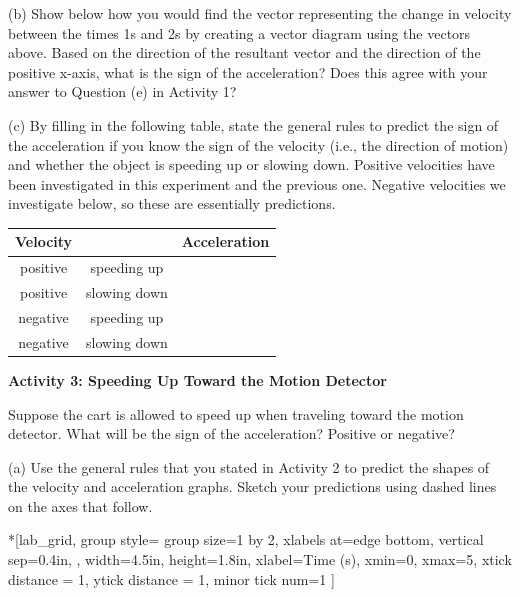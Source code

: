 (b) Show below how you would find the vector representing the change in velocity
between the times 1s and 2s by creating a vector diagram using the vectors 
 above. Based on the direction of the resultant vector and the direction of 
the positive x-axis, what is the sign of the acceleration? 
Does this agree with your answer to Question (e) in Activity 1?
\answerspace{25mm}

(c) By filling in the following table, state the general rules to predict the 
sign of the acceleration if you know the sign of the velocity (i.e., the 
direction of motion) and whether the object is speeding up or slowing down. 
Positive velocities have been investigated in this experiment and the previous 
one. Negative velocities we investigate below, so these are essentially 
predictions.

\vspace{0.3cm}
{\centering \begin{tabular}{|c|c|c|}
\hline
Velocity&
&
Acceleration\\
\hline
positive&
speeding up&
\\
\hline
positive&
slowing down&
\\
\hline
negative&
speeding up&
\\
\hline
negative&
slowing down&
\\
\hline
\end{tabular}\par}
\vspace{0.3cm}


\pagebreak[2]
\textbf{Activity 3: Speeding Up Toward the Motion Detector} 

Suppose the cart is allowed to speed up when traveling toward the motion 
detector. What will be the sign of the acceleration? Positive or negative? 

(a) Use the general rules that you stated in Activity 2 to predict the shapes
of the velocity and acceleration graphs. Sketch your predictions using dashed
lines on the axes that follow.

\begin{lab_groupplot}*{}[lab_grid,
	group style={
		group size=1 by 2,
		xlabels at=edge bottom,
		vertical sep=0.4in,
		},
	width=4.5in,  height=1.8in,
	xlabel=Time (s),
	xmin=0, xmax=5,
	xtick distance = 1, 
	ytick distance = 1, 
	minor tick num=1
	]
\nextgroupplot[
	ymin=-1,ymax=1, 
	ylabel={Velocity (m/s)},
	]
\nextgroupplot[
	ymin=-1,ymax=1, 
	ylabel={Acceleration (m/s$^2$)},
	]
\end{lab_groupplot}

